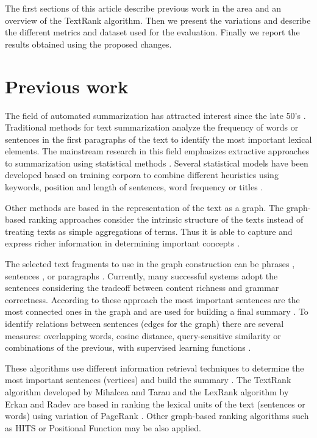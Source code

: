 \documentclass{llncs}
\begin{document}
The first sections of this article describe previous work in the area and an overview of the TextRank algorithm. Then we present the variations and describe the different metrics and dataset used for the evaluation. Finally we report the results obtained using the proposed changes.

\section{Previous work}
The field of automated summarization has attracted interest since the late 50's \cite{luhn}. Traditional methods for text summarization analyze the frequency of words or sentences in the first paragraphs of the text to identify the most important lexical elements. The mainstream research in this field emphasizes extractive approaches to summarization using statistical methods \cite{a_survey}. Several statistical models have been developed based on training corpora to combine different heuristics using keywords, position and length of sentences, word frequency or titles \cite{hovy}. 

Other methods are based in the representation of the text as a graph. The graph-based ranking approaches consider the intrinsic structure of the texts instead of treating texts as simple aggregations of terms. Thus it is able to capture and express richer information in determining important concepts \cite{similarity_functions}.

The selected text fragments to use in the graph construction can be phrases \cite{lexical_chains}, sentences \cite{luhn}, or paragraphs \cite{scalable_summarization}. Currently, many successful systems adopt the sentences considering the tradeoff between content richness and grammar correctness. According to these approach the most important sentences are the most connected ones in the graph and are used for building a final summary \cite{barzilay}. To identify relations between sentences (edges for the graph) there are several measures: overlapping words, cosine distance, query-sensitive similarity or combinations of the previous, with supervised learning functions \cite{similarity_functions}.

These algorithms use different information retrieval techniques to determine the most important sentences (vertices) and build the summary \cite{salton}. The TextRank algorithm developed by Mihalcea and Tarau \cite{mihalcea-tarau} and the LexRank algorithm by Erkan and Radev \cite{erkan} are based in ranking the lexical units of the text (sentences or words) using variation of PageRank \cite{pageetal98}. Other graph-based ranking algorithms such as HITS \cite{kleinberg} or Positional Function \cite{herings} may be also applied.
\end{document}
